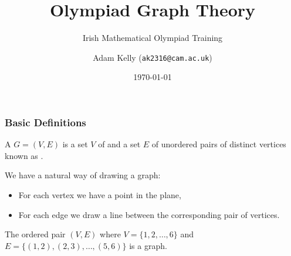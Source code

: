 \documentclass[11pt, mathserif]{beamer}
\title{Olympiad Graph Theory}
\subtitle{Irish Mathematical Olympiad Training}
\author{Adam Kelly (\texttt{ak2316@cam.ac.uk})}
\date{\today}
\theoremstyle{definition}
\theoremstyle{remark}
\begin{document}
\maketitle

\begin{frame}
  \frametitle{Basic Definitions}

  \begin{definition}[Graph]
    A  $G = (V, E)$ is a set $V$ of  and a set $E$ of unordered pairs of distinct vertices known as .
  \end{definition}

  \vspace{1cm}
  \pause
  We have a natural way of drawing a graph:
  \begin{itemize}
    \item For each vertex we have a point in the plane,
    \item For each edge we draw a line between the corresponding pair of vertices.
  \end{itemize}

  \pause
  
  
  \begin{example}[Path]
    The ordered pair $(V, E)$ where $V = \{1, 2, \dots, 6\}$ and $E = \{ (1, 2), (2, 3), \dots, (5, 6)\}$ is a graph.
  \begin{center}
      
  
  
        \begin{tikzpicture}[x=0.75pt,y=0.75pt,yscale=-1,xscale=1]
  

\end{tikzpicture}
\end{center}
\end{example}
\end{frame}
\end{document}
